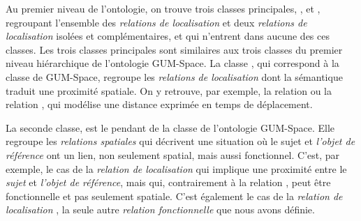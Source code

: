 Au premier niveau de l'ontologie, on trouve trois classes principales,
,
 et
,
regroupant l'ensemble des \emph{relations de localisation} et deux
\emph{relations de localisation} isolées et complémentaires,
 et 
qui n'entrent dans aucune des ces classes. Les trois classes
principales sont similaires aux trois classes du premier niveau
hiérarchique de l'ontologie GUM-Space. La classe
, qui
correspond à la classe
 de GUM-Space,
regroupe les \emph{relations de localisation} dont la sémantique
traduit une proximité spatiale. On y retrouve, par exemple, la
relation  ou la relation
, qui modélise une distance exprimée
en temps de déplacement.

La seconde classe,
 est le
pendant de la classe
 de
l'ontologie GUM-Space. Elle regroupe les \emph{relations spatiales}
qui décrivent une situation où le sujet et \emph{l'objet de référence}
ont un lien, non seulement spatial, mais aussi fonctionnel. C'est, par
exemple, le cas de la \emph{relation de localisation}
 qui implique une proximité entre le
\emph{sujet} et \emph{l'objet de référence}, mais qui, contrairement à
la relation , peut être fonctionnelle et pas
seulement spatiale. C'est également le cas de la \emph{relation de
  localisation}
,
la seule autre \emph{relation fonctionnelle} que nous avons définie.

